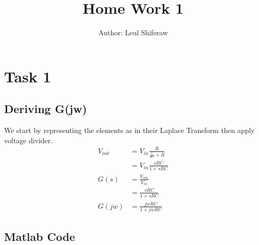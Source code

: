 \documentclass{article}
\title{Home Work 1}
\author{Author: Leul Shiferaw}
\begin{document}
	\maketitle
	
	\section{Task 1}
		\subsection{Deriving G(jw)}
		\noindent We start by representing the elements as in their Laplace Transform then apply voltage divider.\\
		\begin{align*}
			V_{out}&=V_{in}\frac{R}{\frac{1}{sC}+R}\\
				   &=V_{in}\frac{sRC}{1+sRC}\\
			G(s)&=\frac{V_{out}}{V_{in}}\\
			    &=\frac{sRC}{1+sRC}\\
			G(jw)&=\frac{jwRC}{1+jwRC}
		\end{align*}
		\subsection{Matlab Code}
\end{document}
